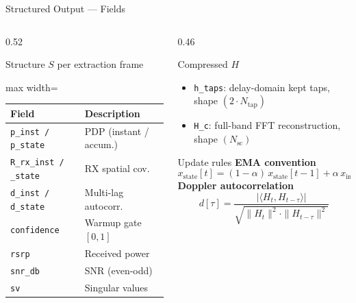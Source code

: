 \documentclass[aspectratio=169, 11pt]{beamer}
\begin{document}
\begin{frame}{Structured Output — Fields}
\begin{columns}[T,onlytextwidth]
\begin{column}{0.52\textwidth}
\begin{block}{Structure $S$ per extraction frame}
\scriptsize
\begin{adjustbox}{max width=\linewidth}
\begin{tabular}{ll}
\toprule
\textbf{Field} & \textbf{Description} \\
\midrule
\texttt{p\_inst / p\_state}   & PDP (instant / accum.) \\
\texttt{R\_rx\_inst / \_state} & RX spatial cov. \\
\texttt{d\_inst / d\_state}   & Multi-lag autocorr. \\
\texttt{confidence}            & Warmup gate $[0,1]$ \\
\texttt{rsrp}                  & Received power \\
\texttt{snr\_db}               & SNR (even-odd) \\
\texttt{sv}                    & Singular values \\
\bottomrule
\end{tabular}
\end{adjustbox}
\end{block}
\end{column}
\begin{column}{0.46\textwidth}
\begin{block}{Compressed $H$}
\small
\begin{itemize}
  \item \texttt{h\_taps}: delay-domain kept taps, shape $(2{\cdot}N_\text{tap})$
  \item \texttt{H\_c}: full-band FFT reconstruction, shape $(N_\text{sc})$
\end{itemize}
\end{block}

\vspace{-2pt}
\begin{block}{Update rules}
\scriptsize
\textbf{EMA convention}
\[
  x_\text{state}[t] = (1{-}\alpha)\,x_\text{state}[t{-}1] + \alpha\,x_\text{inst}[t]
\]
\vspace{-9pt}
\textbf{Doppler autocorrelation}
\[
  d[\tau] = \frac{|\langle H_t, H_{t{-}\tau}\rangle|}
                 {\sqrt{\|H_t\|^2 \cdot \|H_{t{-}\tau}\|^2}}
\]
\end{block}
\end{column}
\end{columns}
\end{frame}
\end{document}
